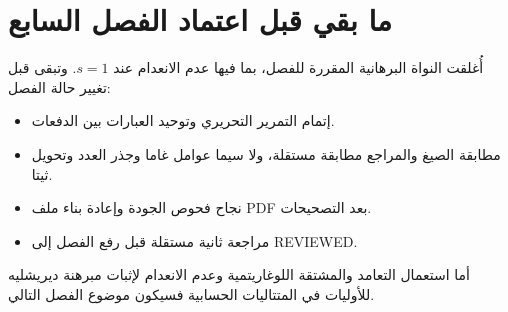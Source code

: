 \section{ما بقي قبل اعتماد الفصل السابع}

أُغلقت النواة البرهانية المقررة للفصل، بما فيها عدم الانعدام عند
\(s=1\). وتبقى قبل تغيير حالة الفصل:

\begin{itemize}
  \item إتمام التمرير التحريري وتوحيد العبارات بين الدفعات.
  \item مطابقة الصيغ والمراجع مطابقة مستقلة، ولا سيما عوامل غاما وجذر العدد
  وتحويل ثيتا.
  \item نجاح فحوص الجودة وإعادة بناء ملف PDF بعد التصحيحات.
  \item مراجعة ثانية مستقلة قبل رفع الفصل إلى \textenglish{REVIEWED}.
\end{itemize}

أما استعمال التعامد والمشتقة اللوغاريتمية وعدم الانعدام لإثبات مبرهنة
ديريشليه للأوليات في المتتاليات الحسابية فسيكون موضوع الفصل التالي.
